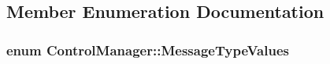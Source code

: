 \subsection{Member Enumeration Documentation}
\hypertarget{class_control_manager_a7b6de4a130e0de1729c7963edd972120}{
\subsubsection[{Message\-Type\-Values}]{\setlength{\rightskip}{0pt plus 5cm}enum {\bf Control\-Manager\-::\-Message\-Type\-Values}\hspace{0.3cm}{\ttfamily [private]}}}\label{class_control_manager_a7b6de4a130e0de1729c7963edd972120}
